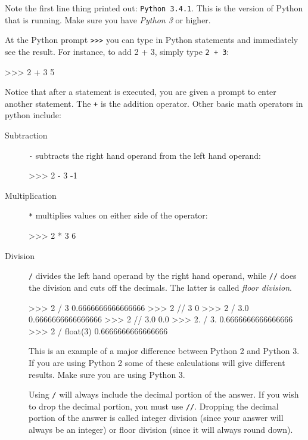 \documentclass[11pt]{cselabheader}
\begin{document}
Note the first line thing printed out: \texttt{Python 3.4.1}. This is the
version of Python that is running. Make sure you have \emph{Python 3} or higher.

At the Python prompt \texttt{>>>} you can type in Python statements and
immediately see the result. For instance, to add 2 + 3, simply type \texttt{2 +
3}: 

\begin{pyconcode}
>>> 2 + 3
5
\end{pyconcode}

Notice that after a statement is executed, you are given a prompt to enter
another statement. The \texttt{+} is the addition operator. Other basic math
operators in python include:

\begin{description}
  \item[Subtraction] \texttt{-} subtracts the right hand operand from the left
    hand operand:

    \begin{pyconcode}
>>> 2 - 3
-1
    \end{pyconcode}

  \item[Multiplication] \texttt{*} multiplies values on either side of the
    operator:

    \begin{pyconcode}
>>> 2 * 3
6
    \end{pyconcode}

  \item[Division] \texttt{/} divides the left hand operand by the right hand
    operand, while \texttt{//} does the division and cuts off the decimals. The
    latter is called \emph{floor division}.

  \begin{pyconcode}
>>> 2 / 3
0.6666666666666666
>>> 2 // 3
0
>>> 2 / 3.0
0.6666666666666666
>>> 2 // 3.0
0.0
>>> 2. / 3.
0.6666666666666666
>>> 2 / float(3)
0.6666666666666666
  \end{pyconcode}

    This is an example of a major difference between Python 2 and Python 3. If
    you are using Python 2 some of these calculations will give different
    results. Make sure you are using Python 3.

    Using \texttt{/} will always include the decimal portion of the answer. If
    you wish to drop the decimal portion, you must use \texttt{//}. Dropping the
    decimal portion of the answer is called integer division (since your answer
    will always be an integer) or floor division (since it will always round
    down).


\end{description}
\end{document}

